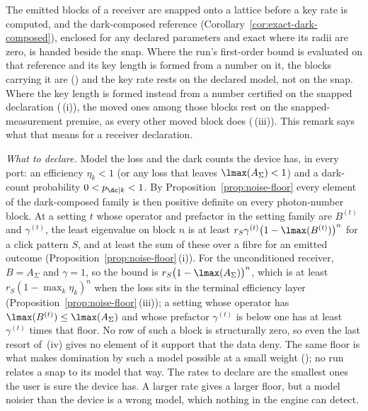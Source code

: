 \begin{remark}\label{rem:noise-floor-receiver}
The emitted blocks of a receiver are snapped onto a lattice before a key
rate is computed, and the dark-composed reference
(Corollary~\ref{cor:exact-dark-composed}), enclosed for any declared
parameters and exact where its radii are zero, is handed beside the snap.
Where the run's first-order bound is evaluated on that reference and its key
length is formed from a number on it, the blocks carrying it are
 () and
the key rate rests on the declared model, not on the snap. Where the key
length is formed instead from a number certified on the snapped declaration
(\,(i)), the moved
ones among those blocks rest on the snapped-measurement premise, as every
other moved block does
(\,(iii)).
This remark says what that means for a receiver declaration.

\emph{What to declare.} Model the loss and the dark counts the device has,
in every port: an efficiency $\eta_k<1$ (or any loss that leaves
$\lmax(A_\Sigma)<1$) and a dark-count probability $0<p_{\dc|k}<1$. By
Proposition~\ref{prop:noise-floor} every element of the dark-composed family
is then positive definite on every photon-number block. At a setting $t$
whose operator and prefactor in the setting family are $B^{(t)}$ and
$\gamma^{(t)}$, the least eigenvalue on block $n$ is at least
$r_S\gamma^{(t)}\big(1-\lmax(B^{(t)})\big)^{n}$ for a click pattern $S$, and
at least the sum of these over a fibre for an emitted outcome
(Proposition~\ref{prop:noise-floor}\,(i)). For the unconditioned receiver,
$B=A_\Sigma$ and $\gamma=1$, so the bound is
$r_S\big(1-\lmax(A_\Sigma)\big)^{n}$, which is at least
$r_S(1-\max_k\eta_k)^{n}$ when the loss sits in the terminal efficiency layer
(Proposition~\ref{prop:noise-floor}\,(iii)); a setting whose operator has
$\lmax(B^{(t)})\le\lmax(A_\Sigma)$ and whose prefactor $\gamma^{(t)}$ is below
one has at least $\gamma^{(t)}$ times that floor. No row of such a block is
structurally zero, so even the last resort of
\,(iv) gives no element of it
support that the data deny. The same floor is what makes domination by such
a model possible at a small weight
(); no run relates a snap to its model
that way. The rates to declare are the smallest ones the
user is sure the device has. A larger rate gives a larger floor, but a model
noisier than the device is a wrong model, which nothing in the engine can
detect.


\end{remark}
